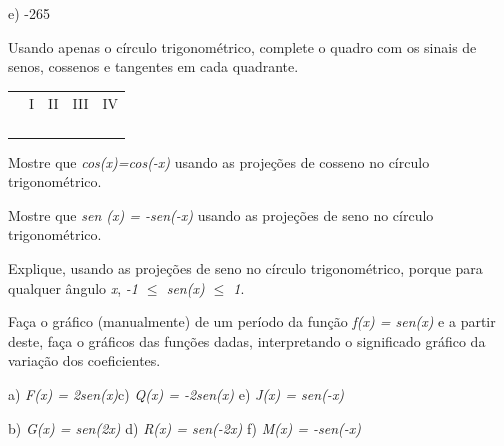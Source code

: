 \begin{exercicios}
e) -265\degree

\exitem{} Usando apenas o círculo trigonométrico, complete o quadro com os sinais de senos, cossenos e tangentes em cada quadrante.

\begin{table}[H]
             \centering
\begin{tabular}{p{0.96in}p{0.41in}p{0.39in}p{0.39in}p{0.39in}}
\hline
\multicolumn{1}{|p{0.96in}}{} &
\multicolumn{1}{|p{0.41in}}{I} &
\multicolumn{1}{|p{0.39in}}{II} &
\multicolumn{1}{|p{0.39in}}{III} &
\multicolumn{1}{|p{0.39in}|}{IV} \\
\hhline{-----}
\multicolumn{1}{|p{0.96in}}{Senos} &
\multicolumn{1}{|p{0.41in}}{} &
\multicolumn{1}{|p{0.39in}}{} &
\multicolumn{1}{|p{0.39in}}{} &
\multicolumn{1}{|p{0.39in}|}{} \\
\hhline{-----}
\multicolumn{1}{|p{0.96in}}{Cossenos} &
\multicolumn{1}{|p{0.41in}}{} &
\multicolumn{1}{|p{0.39in}}{} &
\multicolumn{1}{|p{0.39in}}{} &
\multicolumn{1}{|p{0.39in}|}{} \\
\hhline{-----}
\multicolumn{1}{|p{0.96in}}{Tangentes } &
\multicolumn{1}{|p{0.41in}}{} &
\multicolumn{1}{|p{0.39in}}{} &
\multicolumn{1}{|p{0.39in}}{} &
\multicolumn{1}{|p{0.39in}|}{} \\
\hhline{-----}

\end{tabular}
 \end{table}

\item Mostre que \textit{cos(x)=cos(-x)} usando as projeções de cosseno no círculo trigonométrico.

\item Mostre que  \textit{sen (x) = -sen(-x)} usando as projeções de seno no círculo trigonométrico.

\item Explique, usando as projeções de seno no círculo trigonométrico, porque para qualquer ângulo \textit{x}, \textit{-1 $ \leq $  sen(x) $ \leq $  1}.

\item Faça o gráfico (manualmente) de um período da função \textit{f(x) = sen(x) }e a partir deste, faça o gráficos das funções dadas, interpretando o significado gráfico da variação dos coeficientes.

a) \textit{F(x) = 2sen(x)\tab  \tab }c) \textit{Q(x) = -2sen(x) \tab \tab }e) \textit{J(x) = sen(-x)}

b) \textit{G(x) = sen(2x) \tab }d) \textit{R(x) = sen(-2x) \tab \tab }f) \textit{M(x) = -sen(-x)}


\end{exercicios}
